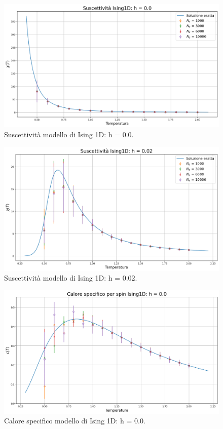 \begin{figure}[H]
    \centering
    \includegraphics[width=\textwidth]{Immagini/simIsing1D/chi_h0.0.png}
    \caption{Suscettività modello di Ising 1D: h = 0.0.}
    \label{fig: chi_Ising1D_h0.0}
\end{figure}

\begin{figure}[H]
    \centering
    \includegraphics[width=\textwidth]{Immagini/simIsing1D/chi_h0.02.png}
    \caption{Suscettività modello di Ising 1D: h = 0.02.}
    \label{fig: chi_Ising1D_h0.0}
\end{figure}

\begin{figure}[H]
    \centering
    \includegraphics[width=\textwidth]{Immagini/simIsing1D/cp_h0.0.png}
    \caption{Calore specifico modello di Ising 1D: h = 0.0.}
    \label{fig: cp_Ising1D_h0.0}
\end{figure}

